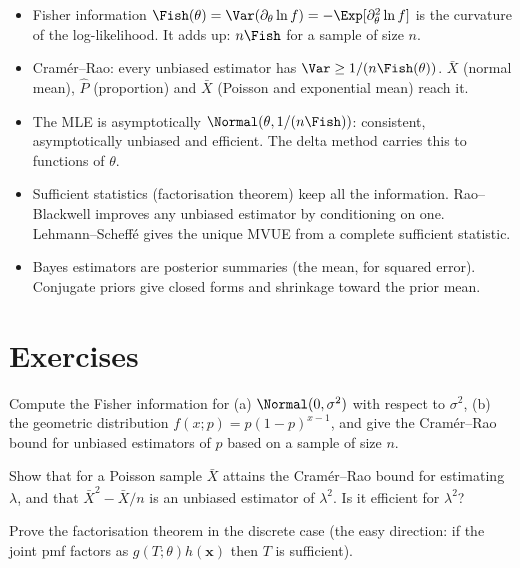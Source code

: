 \begin{summarybox}
\begin{itemize}
  \item Fisher information $\Fish(\theta)=\Var(\partial_\theta\ln f)=-\Exp[\partial_\theta^2\ln f]$ is the curvature of the log-likelihood. It adds up: $n\Fish$ for a sample of size $n$.
  \item Cram\'er--Rao: every unbiased estimator has $\Var\ge1/(n\Fish(\theta))$. $\bar{X}$ (normal mean), $\hat{P}$ (proportion) and $\bar{X}$ (Poisson and exponential mean) reach it.
  \item The MLE is asymptotically $\Normal(\theta,1/(n\Fish))$: consistent, asymptotically unbiased and efficient. The delta method carries this to functions of $\theta$.
  \item Sufficient statistics (factorisation theorem) keep all the information. Rao--Blackwell improves any unbiased estimator by conditioning on one. Lehmann--Scheff\'e gives the unique MVUE from a complete sufficient statistic.
  \item Bayes estimators are posterior summaries (the mean, for squared error). Conjugate priors give closed forms and shrinkage toward the prior mean.
\end{itemize}
\end{summarybox}

\section{Exercises}

\begin{exercise}
Compute the Fisher information for (a) $\Normal(0,\sigma^2)$ with respect to $\sigma^2$, (b) the geometric distribution $f(x;p)=p(1-p)^{x-1}$, and give the Cram\'er--Rao bound for unbiased estimators of $p$ based on a sample of size $n$.
\end{exercise}

\begin{exercise}
Show that for a Poisson sample $\bar{X}$ attains the Cram\'er--Rao bound for estimating $\lambda$, and that $\bar{X}^2-\bar{X}/n$ is an unbiased estimator of $\lambda^2$. Is it efficient for $\lambda^2$?
\end{exercise}

\begin{exercise}
Prove the factorisation theorem in the discrete case (the easy direction: if the joint pmf factors as $g(T;\theta)h(\mathbf{x})$ then $T$ is sufficient).
\end{exercise}

